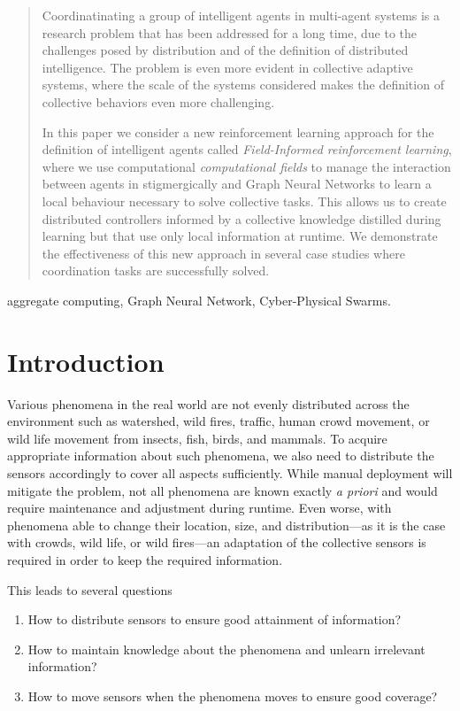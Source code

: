 \documentclass[conference]{IEEEtran}
\begin{document}
\begin{abstract}
Coordinatinating a group of intelligent agents in multi-agent systems 
 is a research problem that has been addressed for a long time, 
 due to the challenges posed by distribution and of the definition of distributed intelligence. 
%
The problem is even more evident in collective adaptive systems, 
 where the scale of the systems considered makes the definition of collective behaviors even more challenging. 

In this paper we consider a new reinforcement learning approach 
  for the definition of intelligent agents called \emph{Field-Informed reinforcement learning}, 
  where we use computational \emph{computational fields} to manage the interaction between agents 
  in stigmergically and Graph Neural Networks to learn a local behaviour necessary to solve collective tasks. 
%
This allows us to create distributed controllers informed by a collective knowledge 
 distilled during learning but that use only local information at runtime.
% 
We demonstrate the effectiveness of this new approach in several case studies 
 where coordination tasks are successfully solved.  
\end{abstract}

\begin{IEEEkeywords}
aggregate computing, Graph Neural Network, Cyber-Physical Swarms.
\end{IEEEkeywords}
%
\section{Introduction}
Various phenomena in the real world are not evenly distributed across the environment such as watershed, wild fires, traffic, human crowd movement, or wild life movement from insects, fish, birds, and mammals.
To acquire appropriate information about such phenomena, we also need to distribute the sensors accordingly to cover all aspects sufficiently. While manual deployment will mitigate the problem, not all phenomena are known exactly \emph{a priori} and would require maintenance and adjustment during runtime. Even worse, with phenomena able to change their location, size, and distribution---as it is the case with crowds, wild life, or wild fires---an adaptation of the collective sensors is required in order to keep the required information. 

This leads to several questions 
\begin{enumerate}
	\item How to distribute sensors to ensure good attainment of information?
	\item How to maintain knowledge about the phenomena and unlearn irrelevant information?
	\item How to move sensors when the phenomena moves to ensure good coverage?
\end{enumerate} 
\end{document}
